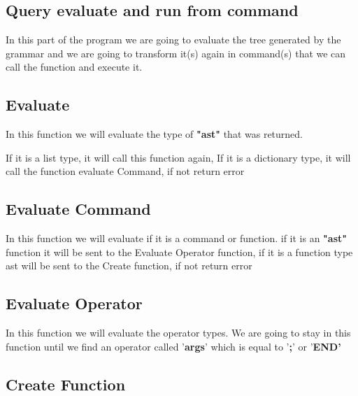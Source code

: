\documentclass{article}
\begin{document}
 
 \clearpage
 
 
\Large
\begin{center}
\section{Query evaluate and run from command}
\end{center}

\setlength{\parindent}{10ex}
In this part of the program we are going to evaluate the tree generated by the grammar and we are going to transform it(s)
again in command(s) that we can call the function and execute it.
\noindent


\vspace{1cm}
\subsection{Evaluate}
\textbf{}

\setlength{\parindent}{10ex}
In this function we will evaluate the type of \textbf{"ast"} that was returned. \par
\noindent If it is a list type, it will call this function again, If it is a dictionary type, it will call the function evaluate Command, if not return error

\vspace{1cm}
\subsection{Evaluate Command}
\textbf{}

\setlength{\parindent}{10ex}
In this function we will evaluate if it is a command or function.
\noindent if it is an \textbf{"ast"} function it will be sent to the Evaluate Operator function, if it is a function type ast will be sent to the Create function, if not return error


\vspace{1cm}
\subsection{Evaluate Operator}
\textbf{}

\setlength{\parindent}{10ex}
In this function we will evaluate the operator types.
\noindent We are going to stay in this function until we find an operator called '\textbf{args}' which is equal to '\textbf{;}' or '\textbf{END'}

\vspace{1cm}
\subsection{Create Function}
\textbf{}
\end{document}
